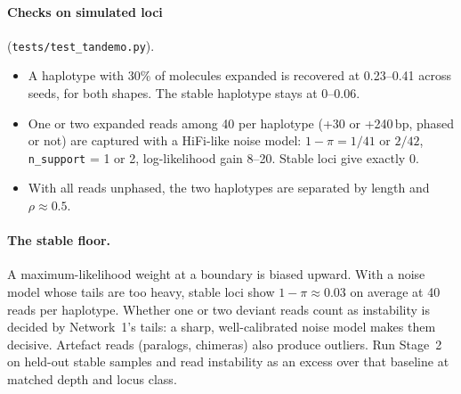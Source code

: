 \documentclass[10pt,a4paper]{article}
\begin{document}
\paragraph{Checks on simulated loci} (\texttt{tests/test\_tandemo.py}).
\begin{itemize}
\item A haplotype with 30\% of molecules expanded is recovered at 0.23--0.41 across seeds, for both shapes. The
stable haplotype stays at 0--0.06.
\item One or two expanded reads among 40 per haplotype (+30 or +240\,bp, phased or not) are captured with a
HiFi-like noise model: $1-\pi=1/41$ or $2/42$, \texttt{n\_support} = 1 or 2, log-likelihood gain 8--20. Stable
loci give exactly 0.
\item With all reads unphased, the two haplotypes are separated by length and $\rho\approx0.5$.
\end{itemize}

\paragraph{The stable floor.} A maximum-likelihood weight at a boundary is biased upward. With a noise model whose
tails are too heavy, stable loci show $1-\pi\approx0.03$ on average at 40 reads per haplotype. Whether one or two
deviant reads count as instability is decided by Network~1's tails: a sharp, well-calibrated noise model makes
them decisive. Artefact reads (paralogs, chimeras) also produce outliers. Run Stage~2 on held-out stable samples
and read instability as an excess over that baseline at matched depth and locus class.
\end{document}
